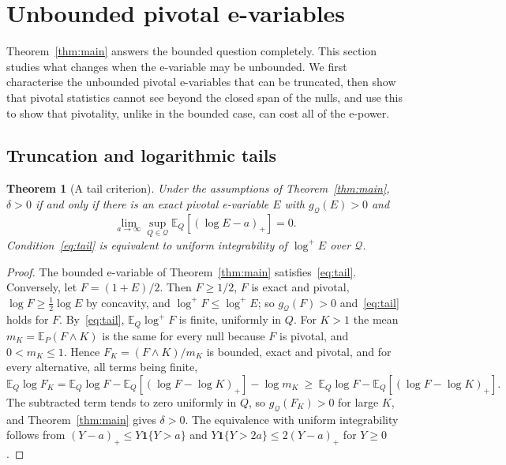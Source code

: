 \documentclass[11pt,a4paper]{article}
\newtheorem{theorem}{Theorem}[section]
\theoremstyle{definition}
\theoremstyle{remark}
\newcommand{\QQ}{\mathcal Q}
\newcommand{\EE}{\mathbb E}
\newcommand{\one}{\mathbf 1}
\begin{document}
\section{Unbounded pivotal e-variables}\label{sec:unbounded}

Theorem~\ref{thm:main} answers the bounded question completely. This section studies what changes when the e-variable may be unbounded. We first characterise the unbounded pivotal e-variables that can be truncated, then show that pivotal statistics cannot see beyond the closed span of the nulls, and use this to show that pivotality, unlike in the bounded case, can cost all of the e-power.

\subsection{Truncation and logarithmic tails}

\begin{theorem}[A tail criterion]\label{thm:UI}
Under the assumptions of Theorem~\ref{thm:main}, \(\delta>0\) if and only if there is an exact pivotal e-variable \(E\) with \(g_{\QQ}(E)>0\) and
\begin{equation}\label{eq:tail}
 \lim_{a\to\infty}\sup_{Q\in\QQ}\EE_Q[(\log E-a)_+]=0 .
\end{equation}
Condition~\eqref{eq:tail} is equivalent to uniform integrability of \(\log^+E\) over \(\QQ\).
\end{theorem}
\begin{proof}
The bounded e-variable of Theorem~\ref{thm:main} satisfies~\eqref{eq:tail}. Conversely, let \(F=(1+E)/2\). Then \(F\ge1/2\), \(F\) is exact and pivotal, \(\log F\ge\frac12\log E\) by concavity, and \(\log^+F\le\log^+E\); so \(g_{\QQ}(F)>0\) and~\eqref{eq:tail} holds for \(F\). By~\eqref{eq:tail}, \(\EE_Q\log^+F\) is finite, uniformly in \(Q\). For \(K>1\) the mean \(m_K=\EE_P(F\wedge K)\) is the same for every null because \(F\) is pivotal, and \(0<m_K\le1\). Hence \(F_K=(F\wedge K)/m_K\) is bounded, exact and pivotal, and for every alternative, all terms being finite,
\[
 \EE_Q\log F_K=\EE_Q\log F-\EE_Q[(\log F-\log K)_+]-\log m_K\ \ge\ \EE_Q\log F-\EE_Q[(\log F-\log K)_+].
\]
The subtracted term tends to zero uniformly in \(Q\), so \(g_{\QQ}(F_K)>0\) for large \(K\), and Theorem~\ref{thm:main} gives \(\delta>0\). The equivalence with uniform integrability follows from \((Y-a)_+\le Y\one\{Y>a\}\) and \(Y\one\{Y>2a\}\le2(Y-a)_+\) for \(Y\ge0\).
\end{proof}
\end{document}
